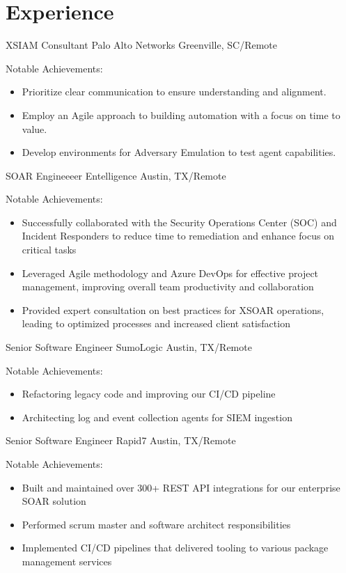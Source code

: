 \documentclass[11pt,a4paper,sans]{moderncv}
\begin{document}
\section{Experience}
{XSIAM Consultant}
{Palo Alto Networks}
{Greenville, SC/Remote}
{}
{Notable Achievements:
    \begin{itemize}%
        \setlength\itemsep{.25em}
        \item Prioritize clear communication to ensure understanding and alignment. 
        \item Employ an Agile approach to building automation with a focus on time to value.
        \item Develop environments for Adversary Emulation to test agent capabilities.
    \end{itemize}}

{SOAR Engineeeer}
{Entelligence}
{Austin, TX/Remote}
{}
{Notable Achievements:
    \begin{itemize}%
        \setlength\itemsep{.25em}
        \item Successfully collaborated with the Security Operations Center (SOC) and Incident Responders to reduce time to remediation and enhance focus on critical tasks
        \item Leveraged Agile methodology and Azure DevOps for effective project management, improving overall team productivity and collaboration
        \item Provided expert consultation on best practices for XSOAR operations, leading to optimized processes and increased client satisfaction
    \end{itemize}}

{Senior Software Engineer}
{SumoLogic}
{Austin, TX/Remote}
{}
{Notable Achievements:
    \begin{itemize}%
        \setlength\itemsep{.25em}
        \item Refactoring legacy code and improving our CI/CD pipeline
        \item Architecting log and event collection agents for SIEM ingestion
    \end{itemize}}
{Senior Software Engineer}
{Rapid7}
{Austin, TX/Remote}
{}
{Notable Achievements:
    \begin{itemize}%
        \setlength\itemsep{.25em}
        \item Built and maintained over 300+ REST API integrations for our enterprise SOAR solution
        \item Performed scrum master and software architect responsibilities
        \item Implemented CI/CD pipelines that delivered tooling to various package management services
    \end{itemize}}
\end{document}
